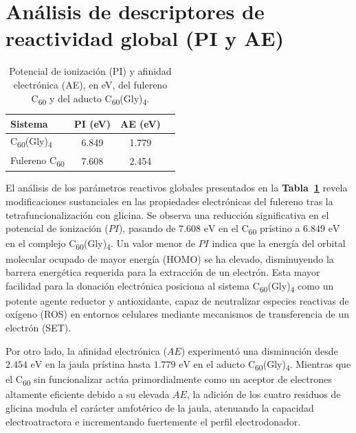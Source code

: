 \section{Análisis de descriptores de reactividad global (PI y AE)}
\begin{table}[H]
    \centering
    \caption{Potencial de ionización (PI) y afinidad electrónica (AE), en eV, del fulereno C\textsubscript{60} y del aducto C\textsubscript{60}(Gly)\textsubscript{4}.}
    \label{tab:energias-referencia}
    \renewcommand{\arraystretch}{1.15}
    \begin{tabular}{lccc}
        \toprule
        \textbf{Sistema} & \textbf{PI (eV)} & \textbf{AE (eV)}\\
        \midrule
         C\textsubscript{60}(Gly)\textsubscript{4} & 6.849
 & 1.779 \\
        Fulereno  C\textsubscript{60} & 7.608
 & 2.454 \\
        \bottomrule
    \end{tabular}
\end{table}

El análisis de los parámetros reactivos globales presentados en la  \textbf{Tabla~\ref{tab:energias-referencia}} revela modificaciones sustanciales en las propiedades electrónicas del fulereno tras la tetrafuncionalización con glicina. Se observa una reducción significativa en el potencial de ionización ($PI$), pasando de $7.608\text{ eV}$ en el C\textsubscript{60} prístino a $6.849\text{ eV}$ en el complejo C\textsubscript{60}(Gly)\textsubscript{4}. Un valor menor de $PI$ indica que la energía del orbital molecular ocupado de mayor energía (HOMO) se ha elevado, disminuyendo la barrera energética requerida para la extracción de un electrón. Esta mayor facilidad para la donación electrónica posiciona al sistema C\textsubscript{60}(Gly)\textsubscript{4} como un potente agente reductor y antioxidante, capaz de neutralizar especies reactivas de oxígeno (ROS) en entornos celulares mediante mecanismos de transferencia de un electrón (SET).

Por otro lado, la afinidad electrónica ($AE$) experimentó una disminución desde $2.454\text{ eV}$ en la jaula prístina hasta $1.779\text{ eV}$ en el aducto C\textsubscript{60}(Gly)\textsubscript{4}. Mientras que el C\textsubscript{60} sin funcionalizar actúa primordialmente como un aceptor de electrones altamente eficiente debido a su elevada $AE$, la adición de los cuatro residuos de glicina modula el carácter amfotérico de la jaula, atenuando la capacidad electroatractora e incrementando fuertemente el perfil electrodonador.

